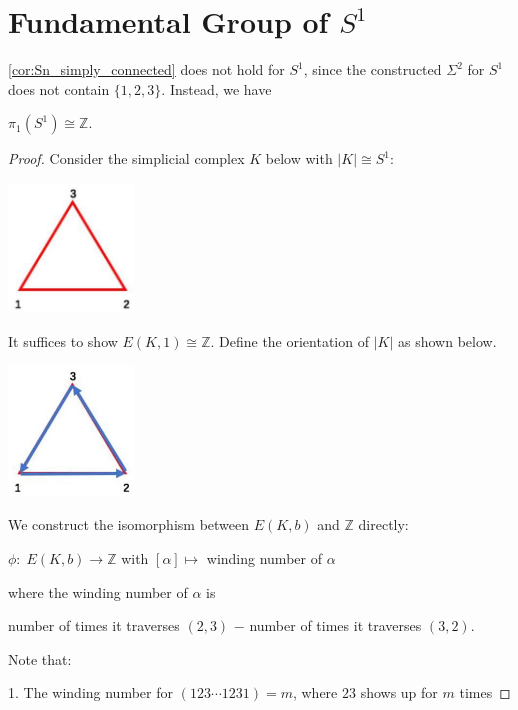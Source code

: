 \section{Fundamental Group of $S^1$}
\autoref{cor:Sn_simply_connected} does not hold for \({S}^{1}\), since the constructed \(\Sigma^{2}\) for \({S}^{1}\) does not contain \(\{ 1,2,3\}\). Instead, we have
\begin{theorem} \({\pi }_{1}\left( {S}^{1}\right)  \cong  \mathbb{Z}\).
\end{theorem}
\begin{proof} Consider the simplicial complex \(K\) below with $|K| \cong S^1$:
\begin{center}
\includegraphics[width=0.25\textwidth]{images/Ch8_triangle.jpg}
\end{center}
It suffices to show \(E\left( {K,1}\right)  \cong  \mathbb{Z}\). Define the orientation of \(\left| K\right|\) as shown below.
\begin{center}
\includegraphics[width=0.25\textwidth]{images/Ch8_triangle_oriented.jpg}
\end{center}
We construct the isomorphism between \(E\left( {K,b}\right)\) and \(\mathbb{Z}\) directly:
\begin{center}
\(\phi : \;E\left( {K,b}\right)  \rightarrow  \mathbb{Z}\)
with \(\left\lbrack  \alpha \right\rbrack   \mapsto\) winding number of \(\alpha\)
\end{center}
where the winding number of \(\alpha\) is 
\begin{center}
number of times it traverses $(2,3)$ $-$ number of times it traverses $(3,2)$.
\end{center}
Note that:

1. The winding number for \(\left( {1{23}\cdots {123}1}\right)  = m\), where $23$ shows up for \(m\) times


\end{proof}
